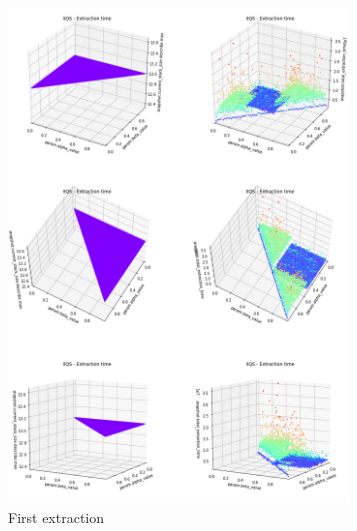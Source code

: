 \begin{figure}
    \centering
    \begin{subfigure}[b]{0.45\textwidth}
        \centering
        \includegraphics[width=0.99\textwidth]{./fragments/04_experimental_execution/images/04_alphabeta_singleclass_stack.png}%
        \caption{First extraction}
        \label{FIG:05_ALPHABETA_RELATIONSHIP_SINGLECLASS_STACK__0_0}
    \end{subfigure}
    \begin{subfigure}[b]{0.45\textwidth}
        \centering

\end{subfigure}
\end{figure}
